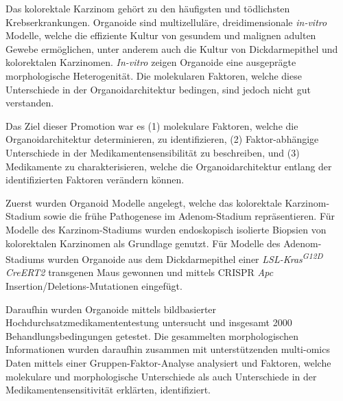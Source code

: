 Das kolorektale Karzinom gehört zu den häufigsten und tödlichsten Krebserkrankungen. Organoide sind multizelluläre, dreidimensionale \textit{in-vitro} Modelle, welche die effiziente Kultur von gesundem und malignen adulten Gewebe ermöglichen, unter anderem auch die Kultur von Dickdarmepithel und kolorektalen Karzinomen. \textit{In-vitro} zeigen Organoide eine ausgeprägte morphologische Heterogenität. Die molekularen Faktoren, welche diese Unterschiede in der Organoidarchitektur bedingen, sind jedoch nicht gut verstanden.
\bigbreak

Das Ziel dieser Promotion war es (1) molekulare Faktoren, welche die Organoidarchitektur determinieren, zu identifizieren, (2) Faktor-abhängige Unterschiede in der Medikamentensensibilität zu beschreiben, und (3) Medikamente zu charakterisieren, welche die Organoidarchitektur entlang der identifizierten Faktoren verändern können. 
\bigbreak

Zuerst wurden Organoid Modelle angelegt, welche das kolorektale Karzinom-Stadium sowie die frühe Pathogenese im Adenom-Stadium repräsentieren. Für Modelle des Karzinom-Stadiums wurden endoskopisch isolierte Biopsien von kolorektalen Karzinomen als Grundlage genutzt. Für Modelle des Adenom-Stadiums wurden Organoide aus dem Dickdarmepithel einer \textit{LSL-Kras\textsuperscript{G12D} CreERT2} transgenen Maus gewonnen und mittels CRISPR  \textit{Apc} Insertion/Deletions-Mutationen eingefügt.
\bigbreak

Daraufhin wurden Organoide mittels bildbasierter Hochdurchsatzmedikamententestung untersucht und insgesamt 2000 Behandlungsbedingungen getestet. Die gesammelten morphologischen Informationen wurden daraufhin zusammen mit unterstützenden multi-omics Daten mittels einer Gruppen-Faktor-Analyse analysiert und Faktoren, welche molekulare und morphologische Unterschiede als auch Unterschiede in der Medikamentensensitivität erklärten, identifiziert.
\bigbreak

